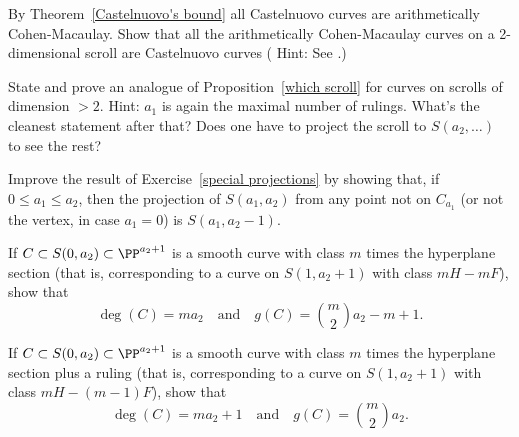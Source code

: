 \begin{exercise}\label{Castelnuovo scrolls}
By Theorem~\ref{Castelnuovo's bound} all Castelnuovo curves are arithmetically Cohen-Macaulay.
Show that all the arithmetically Cohen-Macaulay curves on a 2-dimensional scroll are
Castelnuovo curves ( Hint: See \cite[Section 3c]{MR685427}.)
\end{exercise}


\begin{exercise}
State and prove an analogue of Proposition~\ref{which scroll} for curves on scrolls of dimension $>2$.
Hint: $a_1$ is again the maximal number of rulings. What's the cleanest statement after that? Does one have
to project the scroll to $S(a_2, \dots)$ to see the rest?
\end{exercise}


\begin{exercise}\label{general projections}
Improve the result of Exercise~\ref{special projections} by showing that, if $0\leq a_1\leq a_2$, then
 the projection of $S(a_1,a_2)$ from any point not on $C_{a_1}$ (or not the vertex, in case $a_1=0$) is 
 $S(a_1, a_2-1)$.
\end{exercise}


\begin{exercise}\label{curves on cones}
\item If $C \subset S(0, a_2) \subset \PP^{a_2+1}$ is a smooth curve with class $m$ times the hyperplane section (that is, corresponding to a curve on $S(1,a_2+1)$ with class $mH - mF$), show that
$$
\deg(C) = ma_2 \quad \text{and} \quad g(C) = \binom{m}{2}a_2 - m + 1.
$$
\item If $C \subset S(0, a_2) \subset \PP^{a_2+1}$ is a smooth curve with class $m$ times the hyperplane section plus a ruling (that is, corresponding to a curve on $S(1,a_2+1)$ with class $mH - (m-1)F$), show that
$$
\deg(C) = ma_2 + 1 \quad \text{and} \quad g(C) = \binom{m}{2}a_2.
$$
\end{exercise}


